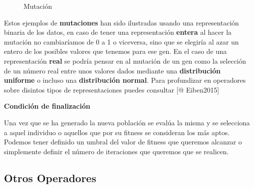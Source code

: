 \documentclass[
  a4paper,
  DIV=11,
  numbers=noendperiod]{scrreprt}
\begin{document}
\begin{figure}
\begin{minipage}{0.50\linewidth}
{}


\end{minipage}%
%
\begin{minipage}{0.50\linewidth}



\end{minipage}%

\caption{\label{fig-crossover}Mutación}

\end{figure}%

Estos ejemplos de \textbf{mutaciones} han sido ilustradas usando una
representación binaria de los datos, en caso de tener una representación
\textbf{entera} al hacer la mutación no cambiaríamos de 0 a 1 o
viceversa, sino que se elegiría al azar un entero de los posibles
valores que tenemos para ese gen. En el caso de una representación
\textbf{real} se podría pensar en al mutación de un gen como la
selección de un número real entre unos valores dados mediante una
\textbf{distribución uniforme} o incluso una \textbf{distribución
normal}. Para profundizar en operadores sobre disintos tipos de
representaciones puedes consultar {[}@ Eiben2015{]}

\textbf{Condición de finalización}

Una vez que se ha generado la nueva población se evalúa la misma y se
selecciona a aquel individuo o aquellos que por su fitness se consideran
los más aptos. Podemos tener definido un umbral del valor de fitness que
queremos alcanzar o simplemente definir el número de iteraciones que
queremos que se realicen.

\subsection{Otros Operadores}\label{otros-operadores}
\end{document}
